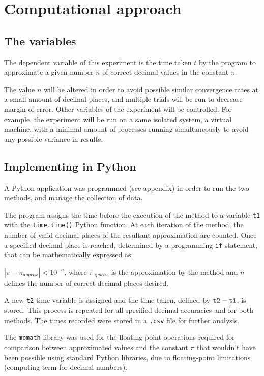 \section{Computational approach}

\subsection{The variables}
The dependent variable of this experiment is the time taken $t$ by the program to approximate a given number $n$ of correct decimal values in the constant $\pi$. 

The value $n$ will be altered in order to avoid possible similar convergence rates at a small amount of decimal places, and multiple trials will be run to decrease margin of error. Other variables of the experiment will be controlled. For example, the experiment will be run on a same isolated system, a virtual machine, with a minimal amount of processes running simultaneously to avoid any possible variance in results. 


\subsection{Implementing in Python}

A Python application was programmed (see appendix) in order to run the two methods, and manage the collection of data.

The program assigns the time before the execution of the method to a variable \verb|t1| with the \verb|time.time()| Python function. At each iteration of the method, the number of valid decimal places of the resultant approximation are counted. Once a specified decimal place is reached, determined by a programming \verb|if| statement, that can be mathematically expressed as:

$| \pi - \pi_{approx} | < 10^{-n}$, where $\pi_{approx}$ is the approximation by the method and $n$ defines the number of correct decimal places desired.

A new \verb|t2| time variable is assigned and the time taken, defined by $\verb|t2| - \verb|t1|$, is stored. This process is repeated for all specified decimal accuracies and for both methods. The times recorded were stored in a \verb|.csv| file for further analysis.

The \verb|mpmath| library was used for the floating point operations required for comparison between approximated values and the constant $\pi$ that wouldn't have been possible using standard Python libraries, due to floating-point limitations (computing term for decimal numbers). \cite{mpmath}